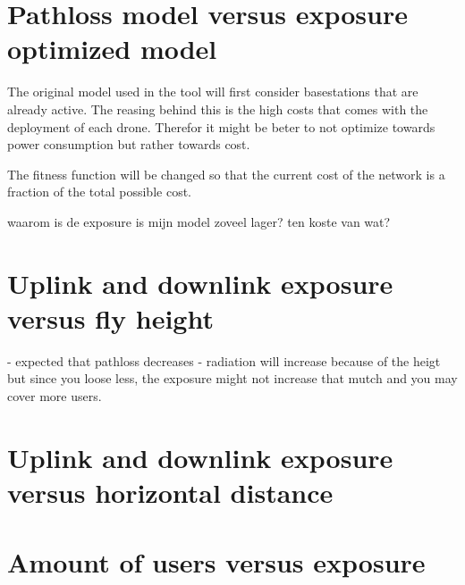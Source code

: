 \section{Pathloss model versus exposure optimized model}
\label{sec:modelcomparison}

The original model used in the tool will first consider basestations that are already active. The reasing behind this is the high costs that comes
with the deployment of each drone. Therefor it might be beter to not optimize towards power consumption but rather towards cost.

The fitness function will be changed so that the current cost of the network is a fraction of the total possible cost.

waarom is de exposure is mijn model zoveel lager? ten koste van wat?

\section{Uplink and downlink exposure versus fly height}
\label{sec:expvsflyheight}

- expected that pathloss decreases
- radiation will increase because of the heigt but since you loose less, the exposure might not increase that mutch and you may cover more users.

\section{Uplink and downlink exposure versus horizontal distance}
\label{sec:sarvsexp}

\section{Amount of users versus exposure}
\label{sec:dlexpvspc}

